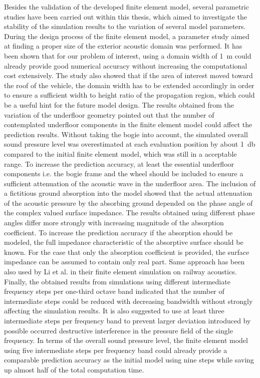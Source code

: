 Besides the validation of the developed finite element model, several parametric studies have been carried out within this thesis, which aimed to investigate the stability of the simulation results to the variation of several model parameters.
During the design process of the finite element model, a parameter study aimed at finding a proper size of the exterior acoustic domain was performed. It has been shown that for our problem of interest, using a domain width of \SI{1}{\meter} could already provide good numerical accuracy without increasing the computational cost extensively. The study also showed that if the area of interest moved toward the roof of the vehicle, the domain width has to be extended accordingly in order to ensure a sufficient width to height ratio of the propagation region, which could be a useful hint for the future model design.
The results obtained from the variation of the underfloor geometry pointed out that the number of contemplated underfloor components in the finite element model could affect the prediction results. Without taking the bogie into account, the simulated overall sound pressure level was overestimated at each evaluation position by about \SI{1}{\decibel} compared to the initial finite element model, which was still in a acceptable range. To increase the prediction accuracy, at least the essential underfloor components i.e. the bogie frame and the wheel should be included to ensure a sufficient attenuation of the acoustic wave in the underfloor area.
The inclusion of a fictitious ground absorption into the model showed that the actual attenuation of the acoustic pressure by the absorbing ground depended on the phase angle of the complex valued surface impedance. The results obtained using different phase angles differ more strongly with increasing magnitude of the absorption coefficient. To increase the prediction accuracy if the absorption should be modeled, the full impedance characteristic of the absorptive surface should be known. For the case that only the absorption coefficient is provided, the surface impedance can be assumed to contain only real part. Same approach has been also used by Li et al. \cite{li_25d_2021} in their finite element simulation on railway acoustics. 
Finally, the obtained results from simulations using different intermediate frequency steps per one-third octave band indicated that the number of intermediate steps could be reduced with decreasing bandwidth without strongly affecting the simulation results. It is also suggested to use at least three intermediate steps per frequency band to prevent larger deviation introduced by possible occurred destructive interference in the pressure field of the single frequency. In terms of the overall sound pressure level, the finite element model using five intermediate steps per frequency band could already provide a comparable prediction accuracy as the initial model using nine steps while saving up almost half of the total computation time.

